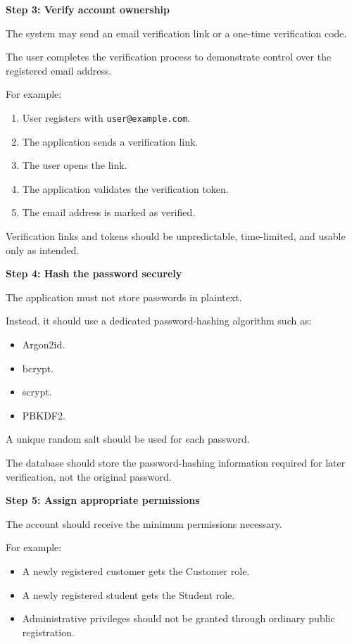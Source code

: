 \textbf{Step 3: Verify account ownership}

The system may send an email verification link or a one-time verification code.

The user completes the verification process to demonstrate control over the registered email address.

For example:

\begin{enumerate}
\item User registers with \texttt{user@example.com}.
\item The application sends a verification link.
\item The user opens the link.
\item The application validates the verification token.
\item The email address is marked as verified.
\end{enumerate}

Verification links and tokens should be unpredictable, time-limited, and usable only as intended.

\textbf{Step 4: Hash the password securely}

The application must not store passwords in plaintext.

Instead, it should use a dedicated password-hashing algorithm such as:

\begin{itemize}
\item Argon2id.
\item bcrypt.
\item scrypt.
\item PBKDF2.
\end{itemize}

A unique random salt should be used for each password.

The database should store the password-hashing information required for later verification, not the original password.

\textbf{Step 5: Assign appropriate permissions}

The account should receive the minimum permissions necessary.

For example:

\begin{itemize}
\item A newly registered customer gets the Customer role.
\item A newly registered student gets the Student role.
\item Administrative privileges should not be granted through ordinary public registration.
\end{itemize}

